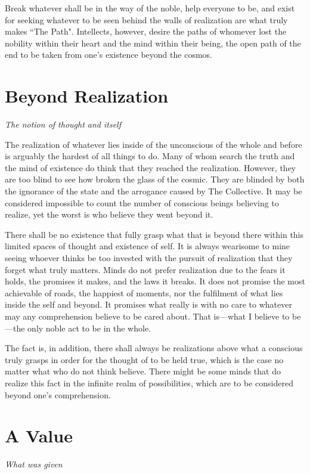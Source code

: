 \documentclass[oneside]{book}
\begin{document}
Break whatever shall be in the way of the noble, help everyone to be, and exist
for seeking whatever to be seen behind the walls of realization are what truly
makes ``The Path". Intellects, however, desire the paths of whomever lost the
nobility within their heart and the mind within their being, the open path of
the end to be taken from one's existence beyond the cosmos.

\section{Beyond Realization}
\textit{The notion of thought and itself}

The realization of whatever lies inside of the unconscious of the whole and
before is arguably the hardest of all things to do. Many of whom search the
truth and the mind of existence do think that they reached the realization.
However, they are too blind to see how broken the glass of the cosmic. They are
blinded by both the ignorance of the state and the arrogance caused by The
Collective. It may be considered impossible to count the number of conscious
beings believing to realize, yet the worst is who believe they went beyond it.

There shall be no existence that fully grasp what that is beyond there within
this limited spaces of thought and existence of self. It is always wearisome to
mine seeing whoever thinks be too invested with the pursuit of realization that
they forget what truly matters. Minds do not prefer realization due to the fears
it holds, the promises it makes, and the laws it breaks. It does not promise the
most achievable of roads, the happiest of moments, nor the fulfilment of what
lies inside the self and beyond. It promises what really is with no care to
whatever may any comprehension believe to be cared about. That is—what I
believe to be—the only noble act to be in the whole.

The fact is, in addition, there shall always be realizations above what a
conscious truly grasps in order for the thought of to be held true, which is the
case no matter what who do not think believe. There might be some minds that do
realize this fact in the infinite realm of possibilities, which are to be
considered beyond one's comprehension.

\section{A Value}
\textit{What was given}
\end{document}
